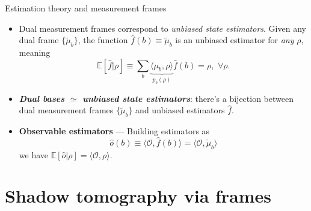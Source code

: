 \documentclass{beamer}
\begin{document}
\begin{frame}{Estimation theory and measurement frames}
    \begin{itemize}
        \item Dual measurement frames correspond to \textit{unbiased state estimators}. Given any dual frame $\{\tilde\mu_b\}$, the function $\hat f(b)\equiv\tilde\mu_b$ is an unbiased estimator for \textit{any} $\rho$, meaning
        \begin{equation*}
            \mathbb{E}[\hat f|\rho]
            \equiv \sum_b \underbrace{\langle\mu_b,\rho\rangle}_{p_b(\rho)} \hat f(b)
            =\rho, \,\,\forall \rho.
        \end{equation*}
        \item {{\bfseries\itshape Dual bases $\simeq$ unbiased state estimators}}: there's a bijection between dual measurement frames $\{\tilde\mu_b\}$ and unbiased estimators $\hat f$.
        \item \textbf{Observable estimators} --- Building estimators as
        \begin{equation*}
            \hat o(b) \equiv \langle \mathcal O,\hat f(b)\rangle =
            \langle \mathcal O,\tilde\mu_b\rangle
        \end{equation*}
        we have
            $\mathbb{E}[\hat o|\rho] = \langle\mathcal O,\rho\rangle.$
    \end{itemize}
\end{frame}

\section{Shadow tomography via frames}
\end{document}
